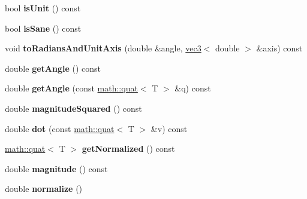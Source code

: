 \begin{DoxyCompactItemize}
\item 
\hypertarget{classmath_1_1quat_a2df407abaadb9e9ac174bc7cca1894f6}{
bool {\bfseries isUnit} () const }
\label{classmath_1_1quat_a2df407abaadb9e9ac174bc7cca1894f6}

\item 
\hypertarget{classmath_1_1quat_ab749bbff5a04904e565f1c2645ea9721}{
bool {\bfseries isSane} () const }
\label{classmath_1_1quat_ab749bbff5a04904e565f1c2645ea9721}

\item 
\hypertarget{classmath_1_1quat_a01c039d3a964b91799b77dd7fda830cb}{
void {\bfseries toRadiansAndUnitAxis} (double \&angle, \hyperlink{classmath_1_1vec3}{vec3}$<$ double $>$ \&axis) const }
\label{classmath_1_1quat_a01c039d3a964b91799b77dd7fda830cb}

\item 
\hypertarget{classmath_1_1quat_a7c9eda8c3ebfc84060e5bf1af7f69c02}{
double {\bfseries getAngle} () const }
\label{classmath_1_1quat_a7c9eda8c3ebfc84060e5bf1af7f69c02}

\item 
\hypertarget{classmath_1_1quat_add88aed99af3a2c89e216cf8391b2aff}{
double {\bfseries getAngle} (const \hyperlink{classmath_1_1quat}{math::quat}$<$ T $>$ \&q) const }
\label{classmath_1_1quat_add88aed99af3a2c89e216cf8391b2aff}

\item 
\hypertarget{classmath_1_1quat_ab10f6a19dac573de28ef8821fb285abd}{
double {\bfseries magnitudeSquared} () const }
\label{classmath_1_1quat_ab10f6a19dac573de28ef8821fb285abd}

\item 
\hypertarget{classmath_1_1quat_a00831f313252fcac1ad596fa43c78625}{
double {\bfseries dot} (const \hyperlink{classmath_1_1quat}{math::quat}$<$ T $>$ \&v) const }
\label{classmath_1_1quat_a00831f313252fcac1ad596fa43c78625}

\item 
\hypertarget{classmath_1_1quat_a2833be37ce750df20814786dc7923f0e}{
\hyperlink{classmath_1_1quat}{math::quat}$<$ T $>$ {\bfseries getNormalized} () const }
\label{classmath_1_1quat_a2833be37ce750df20814786dc7923f0e}

\item 
\hypertarget{classmath_1_1quat_a70506b324aff1df7164d0c41189efc98}{
double {\bfseries magnitude} () const }
\label{classmath_1_1quat_a70506b324aff1df7164d0c41189efc98}

\item 
\hypertarget{classmath_1_1quat_a7cffb626dac428532625923ea4e278ec}{
double {\bfseries normalize} ()}
\label{classmath_1_1quat_a7cffb626dac428532625923ea4e278ec}


\end{DoxyCompactItemize}
